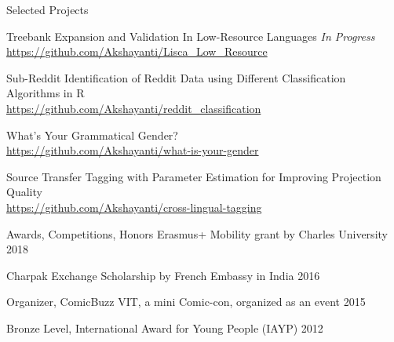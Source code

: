 \documentclass{resume} %
\begin{document}

\begin{rSection}{Selected Projects}

    {Treebank Expansion and Validation In Low-Resource Languages \hfill \textit{In Progress}}\\
        \url{https://github.com/Akshayanti/Lisca_Low_Resource}

    {Sub-Reddit Identification of Reddit Data using Different Classification Algorithms in R}\\
        \url{https://github.com/Akshayanti/reddit_classification}

    {What's Your Grammatical Gender?}\\
        \url{https://github.com/Akshayanti/what-is-your-gender}

    {Source Transfer Tagging with Parameter Estimation for Improving Projection Quality}\\
        \url{https://github.com/Akshayanti/cross-lingual-tagging}

\end{rSection}


\begin{rSection}{Awards, Competitions, Honors}
    {Erasmus+ Mobility grant by Charles University} \hfill
        {2018}

    {Charpak Exchange Scholarship by French Embassy in India} \hfill
        {2016}

    {Organizer, ComicBuzz VIT, a mini Comic-con, organized as an event} \hfill
        {2015}

    {Bronze Level, International Award for Young People (IAYP)} \hfill
        {2012}
\end{rSection}


\end{document}
